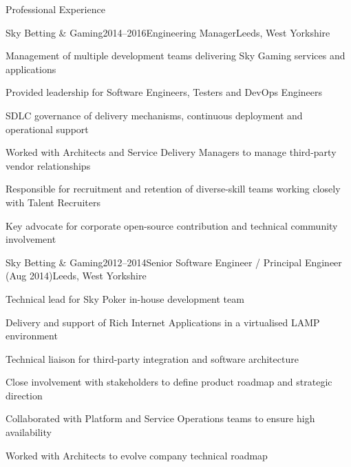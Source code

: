 \documentclass{cv}
\begin{document}

\begin{rSection}{Professional Experience}


\begin{rSubsection}{Sky Betting \& Gaming}{2014--2016}{Engineering Manager}{Leeds, West Yorkshire}
\item Management of multiple development teams delivering Sky Gaming services and applications
\item Provided leadership for Software Engineers, Testers and DevOps Engineers
\item SDLC governance of delivery mechanisms, continuous deployment and operational support
\item Worked with Architects and Service Delivery Managers to manage third-party vendor relationships
\item Responsible for recruitment and retention of diverse-skill teams working closely with Talent Recruiters
\item Key advocate for corporate open-source contribution and technical community involvement
\end{rSubsection}


\begin{rSubsection}{Sky Betting \& Gaming}{2012--2014}{Senior Software Engineer / Principal Engineer (Aug 2014)}{Leeds, West Yorkshire}
\item Technical lead for Sky Poker in-house development team
\item Delivery and support of Rich Internet Applications in a virtualised LAMP environment
\item Technical liaison for third-party integration and software architecture
\item Close involvement with stakeholders to define product roadmap and strategic direction
\item Collaborated with Platform and Service Operations teams to ensure high availability
\item Worked with Architects to evolve company technical roadmap
\end{rSubsection}


\end{rSection}
\end{document}
